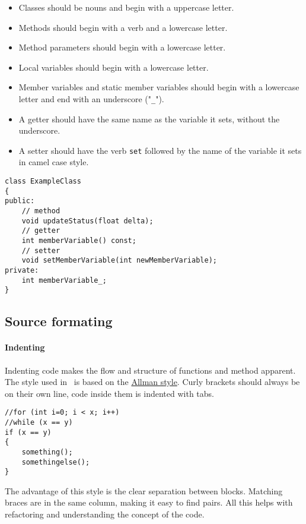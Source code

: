 \begin{itemize}
\item Classes should be nouns and begin with a uppercase letter.
\item Methods should begin with a verb and a lowercase letter.
\item Method parameters should begin with a lowercase letter.
\item Local variables should begin with a lowercase letter.
\item Member variables and static member variables should begin with a lowercase letter and end with an underscore ("\texttt{\_}").
\item A getter should have the same name as the variable it sets, without the underscore.
\item A setter should have the verb \texttt{set} followed by the name of the variable it sets in camel case style.
\end{itemize}

\begin{lstlisting}[caption={Naming example}]
class ExampleClass
{
public:
	// method
	void updateStatus(float delta);
	// getter
	int memberVariable() const;
	// setter
	void setMemberVariable(int newMemberVariable);
private:
	int memberVariable_;
}
\end{lstlisting}


\subsection{Source formating}

\paragraph{Indenting}
Indenting code makes the flow and structure of functions and method apparent.
The style used in \ER\ is based on the \href{http://en.wikipedia.org/wiki/Indent_style}{Allman style}.
Curly brackets should always be on their own line, code inside them is indented with tabs.

\begin{lstlisting}[caption={Indenting example}]
//for (int i=0; i < x; i++)
//while (x == y)
if (x == y)
{
    something();
    somethingelse();
}
\end{lstlisting}

The advantage of this style is the clear separation between blocks.
Matching braces are in the same column, making it easy to find pairs.
All this helps with refactoring and understanding the concept of the code.


